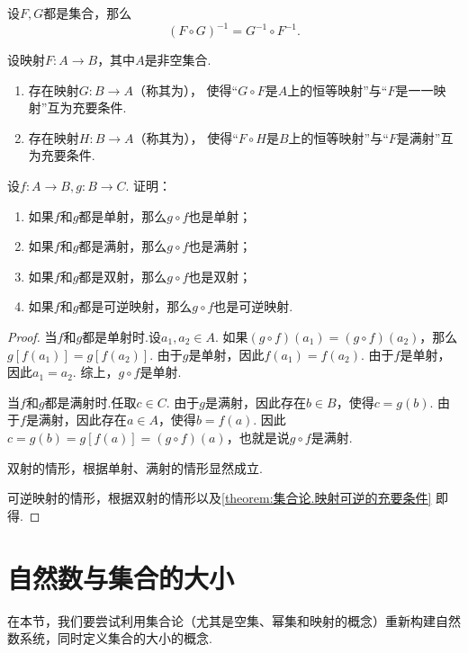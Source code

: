 \begin{theorem}
设\(F,G\)都是集合，那么\[
	(F \circ G)^{-1} = G^{-1} \circ F^{-1}.
\]
\end{theorem}

\begin{theorem}
设映射\(F\colon A \to B\)，其中\(A\)是非空集合.
\begin{enumerate}
	\item 存在映射\(G\colon B \to A\)（称其为），
	使得“\(G \circ F\)是\(A\)上的恒等映射”与“\(F\)是一一映射”互为充要条件.

	\item 存在映射\(H\colon B \to A\)（称其为），
	使得“\(F \circ H\)是\(B\)上的恒等映射”与“\(F\)是满射”互为充要条件.
\end{enumerate}
\end{theorem}

\begin{example}
设\(f\colon A \to B, g\colon B \to C\).
证明：\begin{enumerate}
\item 如果\(f\)和\(g\)都是单射，那么\(g \circ f\)也是单射；
\item 如果\(f\)和\(g\)都是满射，那么\(g \circ f\)也是满射；
\item 如果\(f\)和\(g\)都是双射，那么\(g \circ f\)也是双射；
\item 如果\(f\)和\(g\)都是可逆映射，那么\(g \circ f\)也是可逆映射.
\end{enumerate}
\begin{proof}
当\(f\)和\(g\)都是单射时.设\(a_1,a_2 \in A\).
如果\((g \circ f)(a_1) = (g \circ f)(a_2)\)，那么\(g[f(a_1)] = g[f(a_2)]\).
由于\(g\)是单射，因此\(f(a_1) = f(a_2)\).
由于\(f\)是单射，因此\(a_1 = a_2\).
综上，\(g \circ f\)是单射.

当\(f\)和\(g\)都是满射时.任取\(c \in C\).
由于\(g\)是满射，因此存在\(b \in B\)，使得\(c = g(b)\).
由于\(f\)是满射，因此存在\(a \in A\)，使得\(b = f(a)\).
因此\(c = g(b) = g[f(a)] = (g \circ f)(a)\)，也就是说\(g \circ f\)是满射.

双射的情形，根据单射、满射的情形显然成立.

可逆映射的情形，根据双射的情形以及\cref{theorem:集合论.映射可逆的充要条件} 即得.
\end{proof}
\end{example}

\section{自然数与集合的大小}
在本节，我们要尝试利用集合论（尤其是空集、幂集和映射的概念）重新构建自然数系统，同时定义集合的大小的概念.

